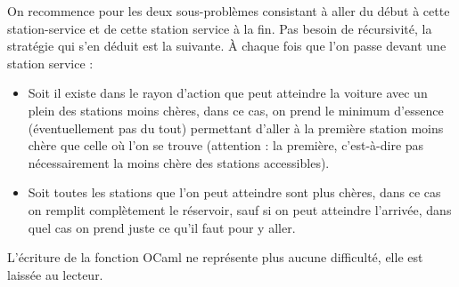 On recommence pour les deux sous-problèmes consistant à aller du début à cette station-service et de cette station service à la fin. Pas besoin de récursivité, la stratégie qui s'en déduit est la suivante. À chaque fois que l'on passe devant une station service :
\begin{itemize}
    \item Soit il existe dans le rayon d'action que peut atteindre la voiture avec un plein des stations moins chères, dans ce cas, on prend le minimum d'essence (éventuellement pas du tout) permettant d'aller à la première station moins chère que celle où l'on se trouve (attention : la première, c'est-à-dire pas nécessairement la moins chère des stations accessibles).
    \item Soit toutes les stations que l'on peut atteindre sont plus chères, dans ce cas on remplit complètement le réservoir, sauf si on peut atteindre l'arrivée, dans quel cas on prend juste ce qu'il faut pour y aller.
\end{itemize}

L'écriture de la fonction OCaml ne représente plus aucune difficulté, elle est laissée au lecteur.
\bigskip

\Fin
